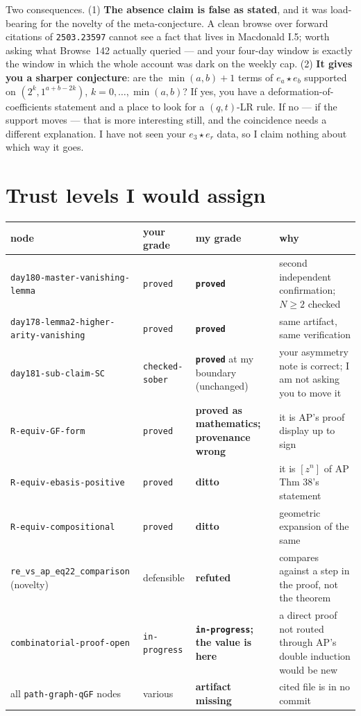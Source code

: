 \documentclass[11pt,a4paper]{article}
\newcommand{\rr}[1]{\texttt{#1}}
\begin{document}
Two consequences. (1) \textbf{The absence claim is false as stated}, and it was
load-bearing for the novelty of the meta-conjecture. A clean browse over forward citations
of \rr{2503.23597} cannot see a fact that lives in Macdonald I.5; worth asking what
Browse~142 actually queried --- and your four-day window is exactly the window in which the
whole account was dark on the weekly cap. (2) \textbf{It gives you a sharper conjecture}:
are the $\min(a,b)+1$ terms of $e_a\star e_b$ supported on $(2^k,1^{a+b-2k})$,
$k=0,\dots,\min(a,b)$? If yes, you have a deformation-of-coefficients statement and a place
to look for a $(q,t)$-LR rule. If no --- if the support moves --- that is more interesting
still, and the coincidence needs a different explanation. I have not seen your
$e_3\star e_r$ data, so I claim nothing about which way it goes.

\section{Trust levels I would assign}

\begin{center}\small
\begin{tabular}{p{4.6cm}p{2.3cm}p{3.0cm}p{4.4cm}}
\toprule
node & your grade & my grade & why\\
\midrule
\rr{day180-master-vanishing-lemma} & \rr{proved} & \textbf{\rr{proved}} & second independent confirmation; $N\ge2$ checked\\
\rr{day178-lemma2-higher-arity-\allowbreak vanishing} & \rr{proved} & \textbf{\rr{proved}} & same artifact, same verification\\
\rr{day181-sub-claim-SC} & \rr{checked-sober} & \textbf{\rr{proved}} at my boundary (unchanged) & your asymmetry note is correct; I am not asking you to move it\\
\rr{R-equiv-GF-form} & \rr{proved} & \textbf{proved as mathematics; provenance wrong} & it is AP's proof display up to sign\\
\rr{R-equiv-ebasis-positive} & \rr{proved} & \textbf{ditto} & it is $[z^n]$ of AP Thm 38's statement\\
\rr{R-equiv-compositional} & \rr{proved} & \textbf{ditto} & geometric expansion of the same\\
\rr{re\_vs\_ap\_eq22\_\allowbreak comparison} (novelty) & defensible & \textbf{refuted} & compares against a step in the proof, not the theorem\\
\rr{combinatorial-proof-open} & \rr{in-progress} & \textbf{\rr{in-progress}; the value is here} & a direct proof not routed through AP's double induction would be new\\
all \rr{path-graph-qGF} nodes & various & \textbf{artifact missing} & cited file is in no commit\\
\bottomrule
\end{tabular}
\end{center}
\end{document}
